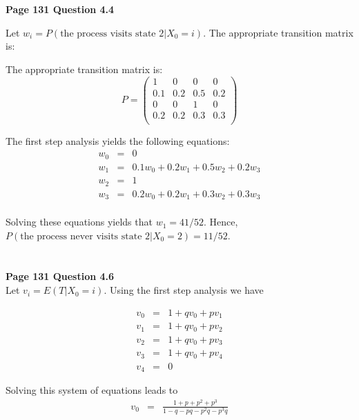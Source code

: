\documentclass{article}
\begin{document}
\begin{flushleft}

\begin{eqnarray*}
\\
\end{eqnarray*}


\textbf{Page 131 Question 4.4}

Let $w_i=P(\textrm{the process visits state 2} | X_0=i)$. The
appropriate transition matrix is:

The appropriate transition matrix is:
\[ P = \left ( \begin{array}{cccc}
 1 & 0 & 0 & 0  \\
 0.1 & 0.2 & 0.5 & 0.2  \\
 0 & 0 & 1 & 0  \\
 0.2 & 0.2 & 0.3 & 0.3  \\
\end{array} \right) \]


The first step analysis yields the following equations:
\begin{eqnarray*}
w_0&=&0\\
w_1&=&0.1w_0 + 0.2w_1+0.5w_2+0.2w_3 \\
w_2&=&1\\
w_3&=&0.2 w_0 +0.2w_1+0.3w_2+0.3w_3 \\
\end{eqnarray*}

Solving these equations yields that $w_1=41/52$. Hence,
$P(\textrm{the process never visits state 2} | X_0=2)=11/52$.

\begin{eqnarray*}
\\
\end{eqnarray*}

\textbf{Page 131 Question 4.6}\\
Let $v_i=E(T|X_0=i)$. Using the first step analysis we have

 \begin{eqnarray*}
v_0&=&1+qv_0+pv_1\\
v_1&=&1+qv_0+pv_2\\
v_2&=&1+qv_0+pv_3\\
v_3&=&1+qv_0+pv_4\\
v_4&=&0
 \end{eqnarray*}

Solving this system of equations leads to
\begin{eqnarray*}
v_0&=&\frac{1+p+p^2+p^3}{1-q-pq-p^2q-p^3q}
\end{eqnarray*}



\end{flushleft}
\end{document}

